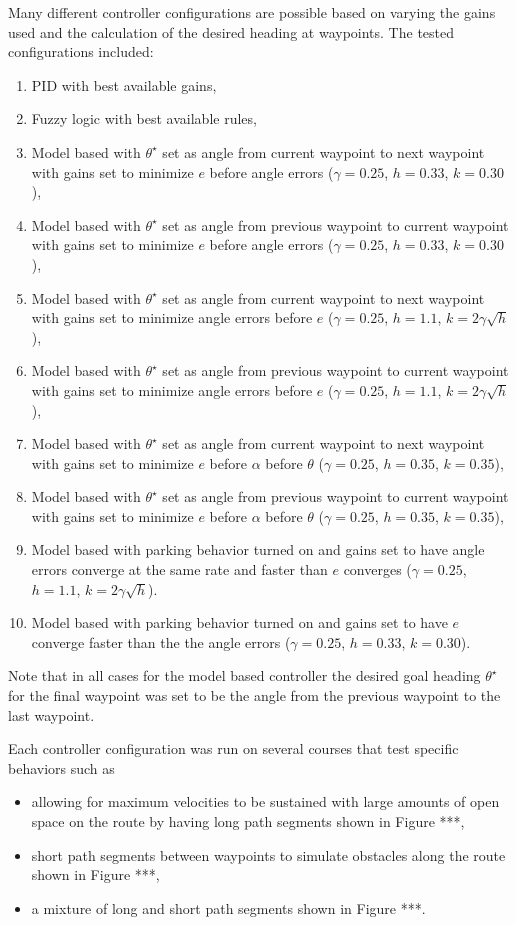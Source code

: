 Many different controller configurations are possible based on varying the gains used and the calculation of the desired heading at waypoints. The tested configurations included:
\begin{enumerate}
\item PID with best available gains,
\item Fuzzy logic with best available rules,
\item Model based with $\theta^\star$ set as angle from current waypoint to next waypoint with gains set to minimize $e$ before angle errors ($\gamma = 0.25$, $h = 0.33$, $k = 0.30$),
\item Model based with $\theta^\star$ set as angle from previous waypoint to current waypoint with gains set to minimize $e$ before angle errors ($\gamma = 0.25$, $h = 0.33$, $k = 0.30$),
\item Model based with $\theta^\star$ set as angle from current waypoint to next waypoint with gains set to minimize angle errors before $e$ ($\gamma = 0.25$, $h = 1.1$, $k = 2\gamma\sqrt{h}$),
\item Model based with $\theta^\star$ set as angle from previous waypoint to current waypoint with gains set to minimize angle errors before $e$ ($\gamma = 0.25$, $h = 1.1$, $k = 2\gamma\sqrt{h}$),
\item Model based with $\theta^\star$ set as angle from current waypoint to next waypoint with gains set to minimize $e$ before $\alpha$ before $\theta$ ($\gamma = 0.25$, $h = 0.35$, $k = 0.35$),
\item Model based with $\theta^\star$ set as angle from previous waypoint to current waypoint with gains set to minimize $e$ before $\alpha$ before $\theta$ ($\gamma = 0.25$, $h = 0.35$, $k = 0.35$),
\item Model based with parking behavior turned on and gains set to have angle errors converge at the same rate and faster than $e$ converges ($\gamma = 0.25$, $h = 1.1$, $k = 2\gamma\sqrt{h}$).
\item Model based with parking behavior turned on and gains set to have $e$ converge faster than the the angle errors ($\gamma = 0.25$, $h = 0.33$, $k = 0.30$).
\end{enumerate}
Note that in all cases for the model based controller the desired goal heading $\theta^\star$ for the final waypoint was set to be the angle from the previous waypoint to the last waypoint.

Each controller configuration was run on several courses that test specific behaviors such as
\begin{itemize}
\item allowing for maximum velocities to be sustained with large amounts of open space on the route by having long path segments shown in Figure ***,
\item short path segments between waypoints to simulate obstacles along the route shown in Figure ***,
\item a mixture of long and short path segments shown in Figure ***.
\end{itemize}


